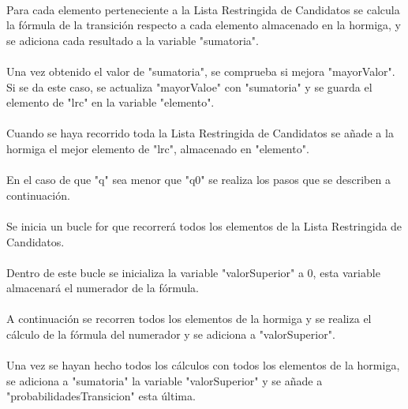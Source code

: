 	\paragraph{}Para cada elemento perteneciente a la Lista Restringida de Candidatos se calcula la fórmula de la transición respecto a cada elemento almacenado en la hormiga, y se adiciona cada resultado a la variable "sumatoria".
	
	\paragraph{}Una vez obtenido el valor de "sumatoria", se comprueba si mejora "mayorValor". Si se da este caso, se actualiza "mayorValoe" con "sumatoria" y se guarda el elemento de "lrc" en la variable "elemento".
	
	\paragraph{}Cuando se haya recorrido toda la Lista Restringida de Candidatos se añade a la hormiga el mejor elemento de "lrc", almacenado en "elemento".
	
	\paragraph{}En el caso de que "q" sea menor que "q0" se realiza los pasos que se describen a continuación.
	
	\paragraph{}Se inicia un bucle for que recorrerá todos los elementos de la Lista Restringida de Candidatos.
	
	\paragraph{}Dentro de este bucle se inicializa la variable "valorSuperior" a 0, esta variable almacenará el numerador de la fórmula.
	
	\paragraph{}A continuación se recorren todos los elementos de la hormiga y se realiza el cálculo de la fórmula del numerador y se adiciona a "valorSuperior".
	
	\paragraph{}Una vez se hayan hecho todos los cálculos con todos los elementos de la hormiga, se adiciona a "sumatoria" la variable "valorSuperior" y se añade a "probabilidadesTransicion" esta última.
	
